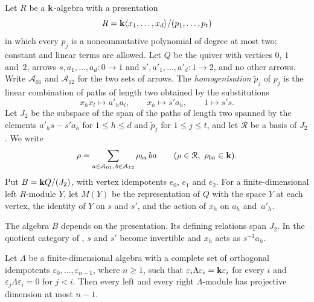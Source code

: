 \begin{construction}
  \label{cons:encoding-algebra}
  Let $R$ be a $\mathbf{k}$-algebra with a presentation
  \[
    R=\mathbf{k}\langle x_1,\dots,x_d\rangle/(p_1,\dots,p_t)
  \]
  in which every $p_j$ is a noncommutative polynomial of degree at most two;
  constant and linear terms are allowed. Let $Q$ be the quiver with vertices
  $0$, $1$ and~$2$, arrows ${s,a_1,\dots,a_d\colon0\to1}$ and
  ${s',a'_1,\dots,a'_d\colon1\to2}$, and no other arrows. Write
  $\mathcal{A}_{01}$ and $\mathcal{A}_{12}$ for the two sets of arrows. The
  \emph{homogenisation} $\widetilde{p}_j$ of $p_j$ is the linear combination of
  paths of length two obtained by the substitutions
  \[
    x_hx_l\longmapsto a'_ha_l,\qquad x_h\longmapsto s'a_h,\qquad
    1\longmapsto s's.
  \]
  Let $J_2$ be the subspace of the span of the paths of length two spanned by
  the elements ${a'_hs-s'a_h}$ for ${1\leq h\leq d}$ and $\widetilde{p}_j$ for
  ${1\leq j\leq t}$, and let $\mathcal{R}$ be a basis of $J_2$. We write
  \[
    \rho=\sum_{a\in\mathcal{A}_{01},\,b\in\mathcal{A}_{12}}\rho_{ba}\,ba
    \qquad(\rho\in\mathcal{R},\ \rho_{ba}\in\mathbf{k}).
  \]
  Put ${B=\mathbf{k} Q/(J_2)}$, with
  vertex idempotents $e_0$, $e_1$ and $e_2$. For a finite-dimensional left
  $R$-module $Y$, let $M(Y)$ be the representation of $Q$ with the space $Y$
  at each vertex, the identity of $Y$ on $s$ and $s'$, and the action of $x_h$
  on $a_h$ and~$a'_h$.
\end{construction}

The algebra $B$ depends on the presentation. Its defining relations span $J_2$.
In the quotient category of , $s$ and $s'$ become invertible
and $x_h$ acts as $s^{-1}a_h$.

\begin{lemma}
  \label{lemma:directed-gldim}
  Let $\Lambda$ be a finite-dimensional algebra with a complete set of
  orthogonal idempotents $\varepsilon_0,\dots,\varepsilon_{n-1}$, where
  ${n\geq1}$, such that ${\varepsilon_i\Lambda\varepsilon_i=\mathbf{k}\varepsilon_i}$ for
  every $i$ and ${\varepsilon_j\Lambda\varepsilon_i=0}$ for ${j<i}$. Then every left
  and every right $\Lambda$-module has projective dimension at most ${n-1}$.
\end{lemma}

